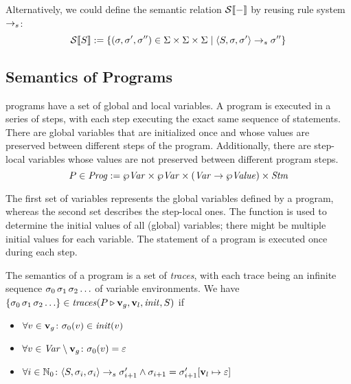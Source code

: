 \documentclass[a4paper,10pt,english]{article}
\begin{document}
Alternatively, we could define the semantic relation $\mathcal{S} \llbracket - \rrbracket$ by reusing rule system $\rightarrow_s$:
\begin{equation*}
	\mathcal{S} \llbracket S \rrbracket := \{ (\sigma, \sigma', \sigma'') \in \Sigma \times \Sigma \times \Sigma \mid \langle S, \sigma,
	\sigma' \rangle \rightarrow_s \sigma'' \}
\end{equation*}

\subsection{Semantics of \Fil Programs}

\Fil programs have a set of global and local variables. A \Fil program is executed in a series of steps, with each step executing
the exact same sequence of statements. There are global variables that are initialized once and whose values are preserved between
different steps of the program. Additionally, there are step-local variables whose values are not preserved between different
program steps.
\begin{equation*}
	P \in \mathit{Prog} := \wp \mathit{Var} \times \wp \mathit{Var} \times (\mathit{Var} \rightarrow \wp \mathit{Value}) \times \mathit{Stm}
\end{equation*}

The first set of variables represents the global variables defined by a program, whereas the second set describes the step-local
ones. The function is used to determine the initial values of all (global) variables; there might be multiple initial
values for each variable. The statement of a program is executed once during each step.

\begin{samepage}
	The semantics of a \Fil program is a set of \textit{traces}, with each trace being an infinite sequence $\sigma_0 \,
	\sigma_1 \, \sigma_2 \ldots$ of variable environments. We have $\{ \sigma_0 \, \sigma_1 \, \sigma_2 \ldots \} \in
	\mathit{traces}(P \triangleright \mathbf{v}_g, \mathbf{v}_l, \mathit{init}, S)$ if
	\begin{itemize}
		\item $\forall v \in \mathbf{v}_g \colon \sigma_0(v) \in \mathit{init}(v)$
		\item $\forall v \in \mathit{Var} \setminus \mathbf{v}_g \colon \sigma_0(v) = \varepsilon$
		\item $\forall i \in \mathbb{N}_0 \colon \langle S, \sigma_i, \sigma_i \rangle \rightarrow_s
		\sigma_{i+1}' \wedge \sigma_{i+1} = \sigma_{i + 1}'[\mathbf{v}_l \mapsto \varepsilon]$
	\end{itemize}
\end{samepage}
\end{document}
